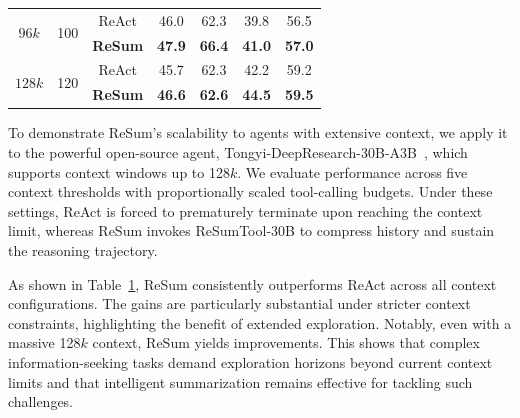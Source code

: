 \begin{table}[!t]
{\begin{tabular}{cc|c|cc|cc}
        \multirow{2}{*}{$96k$} & \multirow{2}{*}{100} & ReAct & {46.0} & {62.3} & {39.8} & {56.5} \\ 
       & & \cellcolor{red!10}\textbf{ReSum} & \cellcolor{red!10}\textbf{47.9} & \cellcolor{red!10}\textbf{66.4} & \cellcolor{red!10}\textbf{41.0} & \cellcolor{red!10}\textbf{57.0} \\ \midrule

       \multirow{2}{*}{$128k$} & \multirow{2}{*}{120} & ReAct & 45.7 & 62.3 & 42.2 & 59.2 \\ 
        & & \cellcolor{red!10}\textbf{ReSum} & \cellcolor{red!10}\textbf{46.6} & \cellcolor{red!10}\textbf{62.6} & \cellcolor{red!10}\textbf{44.5} & \cellcolor{red!10}\textbf{59.5} \\ 
       
       \bottomrule
    \end{tabular}
    }
    \label{tab:tongyidr_resum}
    \vspace*{-10pt}
\end{table}


To demonstrate ReSum’s scalability to agents with extensive context, we apply it to the powerful open-source agent, Tongyi-DeepResearch-30B-A3B~\cite{tongyidr}, which supports context windows up to 128$k$. We evaluate performance across five context thresholds with proportionally scaled tool-calling budgets. Under these settings, ReAct is forced to prematurely terminate upon reaching the context limit, whereas ReSum invokes ReSumTool-30B to compress history and sustain the reasoning trajectory.

As shown in Table~\ref{tab:tongyidr_resum}, ReSum consistently outperforms ReAct across all context configurations. The gains are particularly substantial under stricter context constraints, highlighting the benefit of extended exploration. Notably, even with a massive 128$k$ context, ReSum yields improvements. This shows that complex information-seeking tasks demand exploration horizons beyond current context limits and that intelligent summarization remains effective for tackling such challenges.
